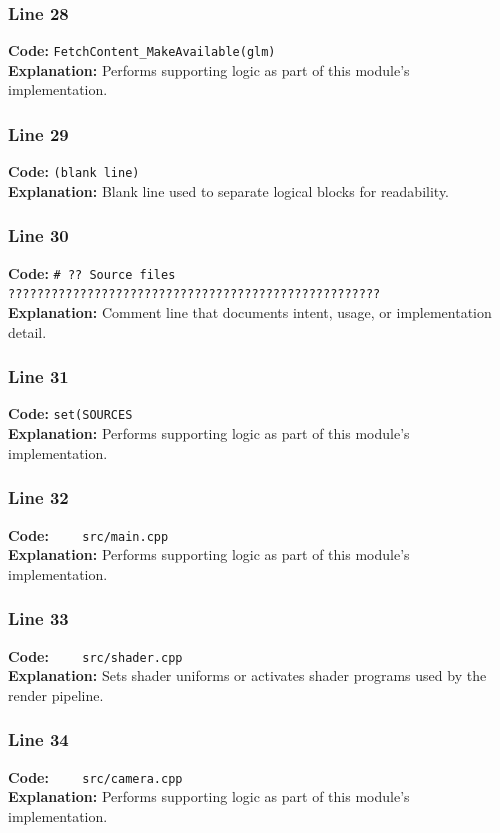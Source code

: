 \documentclass[11pt,a4paper]{article}
\begin{document}
\subsubsection*{Line 28}
\textbf{Code:} \verb|FetchContent_MakeAvailable(glm)|\\
\textbf{Explanation:} Performs supporting logic as part of this module's implementation.

\subsubsection*{Line 29}
\textbf{Code:} \texttt{(blank line)}\\
\textbf{Explanation:} Blank line used to separate logical blocks for readability.

\subsubsection*{Line 30}
\textbf{Code:} \verb|# ?? Source files ????????????????????????????????????????????????????|\\
\textbf{Explanation:} Comment line that documents intent, usage, or implementation detail.

\subsubsection*{Line 31}
\textbf{Code:} \verb|set(SOURCES|\\
\textbf{Explanation:} Performs supporting logic as part of this module's implementation.

\subsubsection*{Line 32}
\textbf{Code:} \verb|    src/main.cpp|\\
\textbf{Explanation:} Performs supporting logic as part of this module's implementation.

\subsubsection*{Line 33}
\textbf{Code:} \verb|    src/shader.cpp|\\
\textbf{Explanation:} Sets shader uniforms or activates shader programs used by the render pipeline.

\subsubsection*{Line 34}
\textbf{Code:} \verb|    src/camera.cpp|\\
\textbf{Explanation:} Performs supporting logic as part of this module's implementation.
\end{document}
